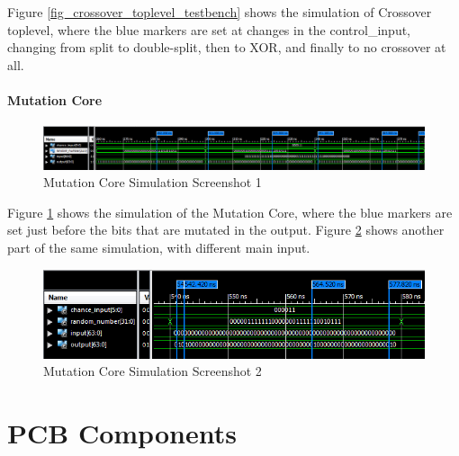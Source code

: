 Figure \ref{fig_crossover_toplevel_testbench} shows the simulation of Crossover toplevel, where the blue markers are set at changes in the control\_input, changing from split to double-split, then to XOR, and finally to no crossover at all.

\subsubsection{Mutation Core}
\begin{figure}[H]
\includegraphics[width=\textwidth]{fpga/fig/testbenches/mutation_simulation1.png}
\caption{Mutation Core Simulation Screenshot 1}
\label{fig_mutation_testbench1}
\end{figure}

Figure \ref{fig_mutation_testbench1} shows the simulation of the Mutation Core, where the blue markers are set just before the bits that are mutated in the output.
Figure \ref{fig_mutation_testbench2} shows another part of the same simulation, with different main input.

\begin{figure}[H]
\includegraphics[width=\textwidth]{fpga/fig/testbenches/mutation_simulation2.png}
\caption{Mutation Core Simulation Screenshot 2}
\label{fig_mutation_testbench2}
\end{figure}


\chapter{PCB Components} \label{appendix:components}

\newpage
